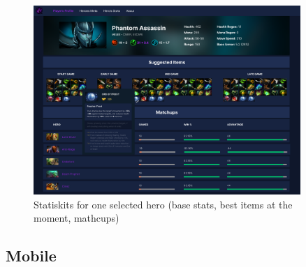    \begin{figure}[h]
        \centering
        \includegraphics[width=0.9\textwidth]{images/SelectedHero}
        \caption{Statiskits for one selected hero (base stats, best items at the moment, mathcups)}
    \end{figure}

    \clearpage

    \subsection{Mobile}

